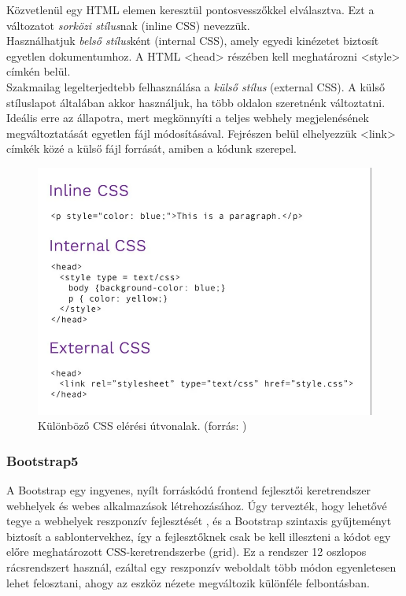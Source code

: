 	Közvetlenül egy HTML elemen keresztül pontosvesszőkkel elválasztva. Ezt a változatot \emph{sorközi stílus}nak (inline CSS) nevezzük. \\

	Használhatjuk \emph{belső stílus}ként (internal CSS), amely egyedi kinézetet biztosít egyetlen dokumentumhoz. A HTML <head> részében kell meghatározni <style> címkén belül. \\

	Szakmailag legelterjedtebb felhasználása a \emph{külső stílus} (external CSS). A külső stíluslapot általában akkor használjuk, ha több oldalon szeretnénk változtatni. Ideális erre az állapotra, mert megkönnyíti a teljes webhely megjelenésének megváltoztatását egyetlen fájl módosításával. Fejrészen belül elhelyezzük <link> címkék közé a külső fájl forrását, amiben a kódunk szerepel.

\begin{figure}[h]
\centering
\includegraphics[scale=0.5]{images/cssTypes.png}
\caption{Különböző CSS elérési útvonalak. (forrás: \cite{cssTypes})}
\label{fig:css}
\end{figure}

\subsubsection{Bootstrap5}

A Bootstrap egy ingyenes, nyílt forráskódú frontend fejlesztői keretrendszer webhelyek és webes alkalmazások létrehozásához. Úgy tervezték, hogy lehetővé tegye a webhelyek reszponzív fejlesztését , és a Bootstrap szintaxis gyűjteményt biztosít a sablontervekhez, így a fejlesztőknek csak be kell illeszteni a kódot egy előre meghatározott CSS-keretrendszerbe (grid). Ez a rendszer 12 oszlopos rácsrendszert használ, ezáltal egy reszponzív weboldalt több módon egyenletesen lehet felosztani, ahogy az eszköz nézete megváltozik különféle felbontásban. 

